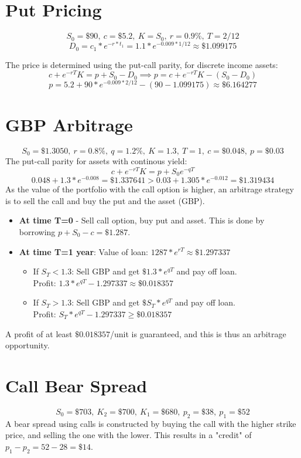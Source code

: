 \documentclass{article}
\begin{document}
\thispagestyle{fancy}

\section{Put Pricing}

$$S_0 = \$90, \ c = \$5.2, \ K = S_0, \ r = 0.9\%, \ T = 2/12 $$
$$D_0 = c_1 * e^{-r * t_1} = 1.1 * e^{-0.009 * 1/12} \approx \$1.099175 $$

The price is determined using the put-call parity, for discrete income assets: 
$$ c + e^{-rT}K = p + S_0 - D_0 \implies p = c + e^{-rT}K - (S_0 - D_0)$$
$$p = 5.2 + 90 * e^{-0.009 * 2/12} - (90 - 1.099175) \approx \$6.164277$$

\section{GBP Arbitrage}

$$S_0 = \$1.3050, \ r = 0.8\%, \ q = 1.2\%, \ K = 1.3, \ T = 1, \ c = \$0.048, \ p=\$0.03$$
The put-call parity for assets with continous yield: 
$$c + e^{-rT}K  = p + S_0 e^{-qT}$$
$$0.048 + 1.3 * e^{-0.008} = \$1.337641 > 0.03 + 1.305*e^{-0.012} = \$1.319434$$
As the value of the portfolio with the call option is higher, an arbitrage strategy is to sell the call and buy the put and the asset (GBP).
\begin{itemize}
	\item \textbf{At time T=0} - Sell call option, buy put and asset. This is done by borrowing $p + S_0 -c = \$1.287$.
	\item \textbf{At time T=1 year}: Value of loan: $1287 * e^{rT} \approx \$1.297337$\begin{itemize}
		\item If $S_T < 1.3$: Sell GBP and get $\$1.3 * e^{qT}$ and pay off loan. \\Profit: $1.3*e^{qT} - 1.297337 \approx \$0.018357$ 
		\item If $S_T > 1.3$: Sell GBP and get $\$S_T * e^{qT}$ and pay off loan. \\Profit: $S_T*e^{qT} - 1.297337 \geq \$0.018357$ 
	\end{itemize}
\end{itemize}
A profit of at least $\$0.018357$/unit is guaranteed, and this is thus an arbitrage opportunity.

\section{Call Bear Spread}
$$ S_0 = \$703, \ K_2 = \$700, \ K_1=\$680, \ p_2 = \$38, \ p_1 = \$52$$
A bear spread using calls is constructed by buying the call with the higher strike price, and selling the one with the lower. This results in a "credit" of $p_1 - p_2 = 52 - 28 = \$14$.
\end{document}
